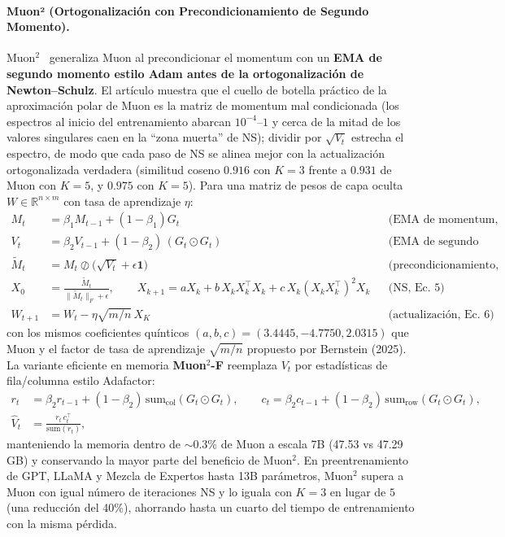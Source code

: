 \paragraph{Muon² (Ortogonalización con Precondicionamiento de Segundo Momento).}
Muon$^2$~\citep{liu_muon2_2026} generaliza Muon al precondicionar el momentum con un
\textbf{EMA de segundo momento estilo Adam antes de la ortogonalización de
Newton--Schulz}. El artículo muestra que el cuello de botella práctico de la aproximación
polar de Muon es la matriz de momentum mal condicionada (los espectros al inicio del
entrenamiento abarcan $10^{-4}$--$1$ y cerca de la mitad de los valores singulares caen en
la ``zona muerta'' de NS); dividir por $\sqrt{V_t}$ estrecha el espectro, de modo que cada
paso de NS se alinea mejor con la actualización ortogonalizada verdadera (similitud coseno
$0.916$ con $K{=}3$ frente a $0.931$ de Muon con $K{=}5$, y $0.975$ con $K{=}5$). Para una
matriz de pesos de capa oculta $W \in \mathbb{R}^{n \times m}$ con tasa de aprendizaje
$\eta$:
\begin{align}
M_t &= \beta_1 M_{t-1} + (1-\beta_1) G_t && \text{(EMA de momentum, Ec.~2)} \\
V_t &= \beta_2 V_{t-1} + (1-\beta_2)\, (G_t \odot G_t) && \text{(EMA de segundo momento, Ec.~3)} \\
\widetilde{M}_t &= M_t \oslash \big(\sqrt{V_t} + \epsilon \mathbf{1}\big) && \text{(precondicionamiento, Ec.~4)} \\
X_0 &= \frac{\widetilde{M}_t}{\|\widetilde{M}_t\|_F + \epsilon}, \qquad
X_{k+1} = aX_k + b\, X_k X_k^\top X_k + c\, X_k (X_k X_k^\top)^2 X_k && \text{(NS, Ec.~5)} \\
W_{t+1} &= W_t - \eta \sqrt{m/n}\, X_K && \text{(actualización, Ec.~6)}
\end{align}
con los mismos coeficientes quínticos $(a,b,c)=(3.4445,-4.7750,2.0315)$ que Muon y el
factor de tasa de aprendizaje $\sqrt{m/n}$ propuesto por Bernstein (2025). La variante
eficiente en memoria \textbf{Muon$^2$-F} reemplaza $V_t$ por estadísticas de fila/columna
estilo Adafactor:
\begin{align}
r_t &= \beta_2 r_{t-1} + (1-\beta_2)\,\mathrm{sum}_{\mathrm{col}}(G_t \odot G_t), \qquad
c_t = \beta_2 c_{t-1} + (1-\beta_2)\,\mathrm{sum}_{\mathrm{row}}(G_t \odot G_t), \\
\widehat{V}_t &= \frac{r_t\, c_t^\top}{\mathrm{sum}(r_t)},
\end{align}
manteniendo la memoria dentro de $\sim$0.3\% de Muon a escala 7B (47.53 vs 47.29 GB) y
conservando la mayor parte del beneficio de Muon$^2$. En preentrenamiento de GPT, LLaMA y
Mezcla de Expertos hasta 13B parámetros, Muon$^2$ supera a Muon con igual número de
iteraciones NS y lo iguala con $K{=}3$ en lugar de $5$ (una reducción del 40\%), ahorrando
hasta un cuarto del tiempo de entrenamiento con la misma pérdida.

